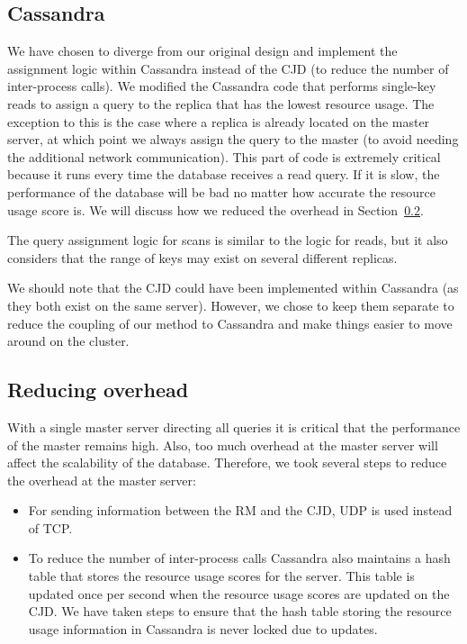 \subsection{Cassandra}
We have chosen to diverge from our original design and implement the assignment logic within Cassandra instead of the CJD (to reduce the number of inter-process calls). We modified the Cassandra code that performs single-key reads to assign a query to the replica that has the lowest resource usage. The exception to this is the case where a replica is already located on the master server, at which point we always assign the query to the master (to avoid needing the additional network communication). This part of code is extremely critical because it runs every time the database receives a read query. If it is slow, the performance of the database will be bad no matter how accurate the resource usage score is. We will discuss how we reduced the overhead in Section~\ref{sec:impl_overhead}.

The query assignment logic for scans is similar to the logic for reads, but it also considers that the range of keys may exist on several different replicas.

We should note that the CJD could have been implemented within Cassandra (as they both exist on the same server). However, we chose to keep them separate to reduce the coupling of our method to Cassandra and make things easier to move around on the cluster.

\subsection{Reducing overhead}
\label{sec:impl_overhead}

With a single master server directing all queries it is critical that the performance of the master remains high. Also, too much overhead at the master server will affect the scalability of the database. Therefore, we took several steps to reduce the overhead at the master server:

\begin{itemize}
\item
For sending information between the RM and the CJD, UDP is used instead of TCP.

\item
To reduce the number of inter-process calls Cassandra also maintains a hash table that stores the resource usage scores for the server. This table is updated once per second when the resource usage scores are updated on the CJD. We have taken steps to ensure that the hash table storing the resource usage information in Cassandra is never locked due to updates. 
\end{itemize}
